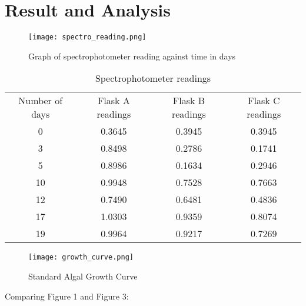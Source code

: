 \documentclass[12pt,a4paper]{article}
\begin{document}
    \section{Result and Analysis}
    \begin{figure}[H]
    	\begin{center}
    		\texttt{[image: spectro\_reading.png]}
    		\caption{Graph of spectrophotometer reading against time in days}
    		\label{fig:spectroreading}
    	\end{center}
    \end{figure}
	\begin{table}[H]
		\centering
		\caption{Spectrophotometer readings}
		\label{spectroreadings}
		\small
		\begin{tabular}{|c|c|c|c|}
			Number of days & Flask A readings & Flask B readings & Flask C readings \\
			0              & 0.3645           & 0.3945           & 0.3945           \\
			3              & 0.8498           & 0.2786           & 0.1741           \\
			5              & 0.8986           & 0.1634           & 0.2946           \\
			10             & 0.9948           & 0.7528           & 0.7663           \\
			12             & 0.7490           & 0.6481           & 0.4836           \\
			17             & 1.0303           & 0.9359           & 0.8074           \\
			19             & 0.9964           & 0.9217           & 0.7269          
		\end{tabular}
		\normalsize
	\end{table}
	\begin{figure}[H]
		\begin{center}
			\texttt{[image: growth\_curve.png]}
			\caption{Standard Algal Growth Curve}
			\label{growthcurve}
		\end{center}
	\end{figure}
    Comparing Figure 1 and Figure 3: \\
    
\end{document}
